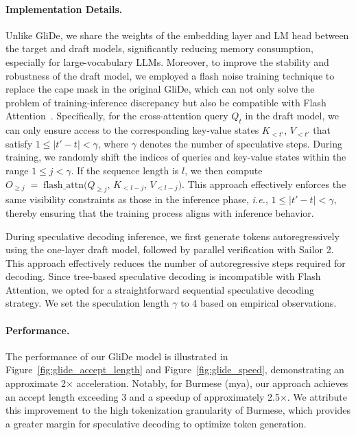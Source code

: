 \paragraph{Implementation Details.} Unlike GliDe, we share the weights of the embedding layer and LM head between the target and draft models, significantly reducing memory consumption, especially for large-vocabulary LLMs. Moreover, to improve the stability and robustness of the draft model, we employed a flash noise training technique to replace the cape mask in the original GliDe, which can not only solve the problem of training-inference discrepancy but also be compatible with Flash Attention~\citep{dao2022flashattention}. Specifically, for the cross-attention query \(Q_t\) in the draft model, we can only ensure access to the corresponding key-value states \(K_{<t'}\), \(V_{<t'}\) that satisfy \( 1\le|t' - t|<\gamma \), where \(\gamma\) denotes the number of speculative steps. During training, we randomly shift the indices of queries and key-value states within the range \(1 \le j < \gamma\).  
If the sequence length is \(l\), we then compute  
\(
O_{\geq j} \;=\; \mathrm{flash\_attn}\bigl(Q_{\geq j}, \,K_{< l-j}, \,V_{< l-j}\bigr).
\)
This approach effectively enforces the same visibility constraints as those in the inference phase, \emph{i.e.}, \( 1\le|t' - t|<\gamma \), thereby ensuring that the training process aligns with inference behavior.



During speculative decoding inference, we first generate tokens autoregressively using the one-layer draft model, followed by parallel verification with Sailor 2. This approach effectively reduces the number of autoregressive steps required for decoding. Since tree-based speculative decoding is incompatible with Flash Attention, we opted for a straightforward sequential speculative decoding strategy. We set the speculation length $\gamma$ to 4 based on empirical observations. 

\paragraph{Performance.} The performance of our GliDe model is illustrated in Figure~\ref{fig:glide_accept_length} and Figure~\ref{fig:glide_speed}, demonstrating an approximate 2$\times$ acceleration. Notably, for Burmese (mya), our approach achieves an accept length exceeding 3 and a speedup of approximately 2.5$\times$. We attribute this improvement to the high tokenization granularity of Burmese, which provides a greater margin for speculative decoding to optimize token generation.


